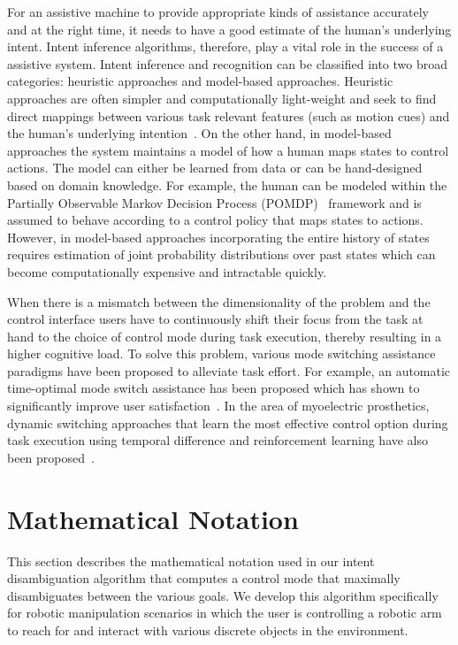 \documentclass[conference]{IEEEtran}
\begin{document}
For an assistive machine to provide appropriate kinds of assistance accurately and at the right time, it needs to have a good estimate of the human's underlying intent. Intent inference algorithms, therefore, play a vital role in the success of a assistive system. Intent inference and recognition can be classified into two broad categories: heuristic approaches and model-based approaches. Heuristic approaches are often simpler and computationally light-weight and seek to find direct mappings between various task relevant features (such as motion cues) and the human's underlying intention~\citep{baker2007goal, baker2009action}. On the other hand, in model-based approaches the system maintains a model of how a human maps states to control actions. The model can either be learned from data or can be hand-designed based on domain knowledge. For example, the human can be modeled within the Partially Observable Markov Decision Process (POMDP)~\citep{dragan2013policy, taha2011pomdp} framework and is assumed to behave according to a control policy that maps states to actions. However, in model-based approaches incorporating the entire history of states requires estimation of joint probability distributions over past states which can become computationally expensive and intractable quickly.

When there is a mismatch between the dimensionality of the problem and the control interface users have to continuously shift their focus from the task at hand to the choice of control mode during task execution, thereby resulting in a higher cognitive load. To solve this problem, various mode switching assistance paradigms have been proposed to alleviate task effort. For example, an automatic time-optimal mode switch assistance has been proposed which has shown to significantly improve user satisfaction~\citep{herlant2016assistive}. In the area of myoelectric prosthetics, dynamic switching approaches that learn the most effective control option during task execution using temporal difference and reinforcement learning have also been proposed~\cite{pilarski2012dynamic}. 


\section{Mathematical Notation}\label{sec:math}
This section describes the mathematical notation used in our intent disambiguation algorithm that computes a control mode that maximally disambiguates between the various goals.
We develop this algorithm specifically for robotic manipulation scenarios in which the user is controlling a robotic arm to reach for and interact with various discrete objects in the environment.
\end{document}
